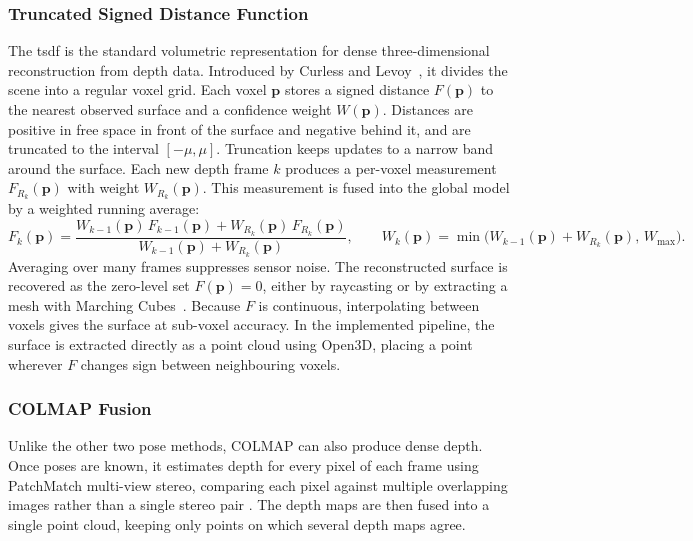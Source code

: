
%
\subsubsection{Truncated Signed Distance Function}
\label{subsec:ch5.tsdf}

The \gls{tsdf} is the standard volumetric
representation for dense three-dimensional reconstruction from depth data. Introduced by
Curless and Levoy~\cite{curlessVolumetricMethodBuilding1996}, it divides the scene
into a regular voxel grid. Each voxel $\mathbf{p}$ stores a signed distance
$F(\mathbf{p})$ to the nearest observed surface and a confidence weight
$W(\mathbf{p})$. Distances are positive in free space in front of the
surface and negative behind it, and are truncated to the interval
$[-\mu, \mu]$. Truncation keeps updates to a narrow band around the
surface. Each new depth frame $k$ produces a per-voxel
measurement $F_{R_k}(\mathbf{p})$ with weight $W_{R_k}(\mathbf{p})$. This
measurement is fused into the global model by a weighted running average:
\begin{equation}
  F_k(\mathbf{p}) =
  \frac{W_{k-1}(\mathbf{p})\,F_{k-1}(\mathbf{p}) + W_{R_k}(\mathbf{p})\,F_{R_k}(\mathbf{p})}
       {W_{k-1}(\mathbf{p}) + W_{R_k}(\mathbf{p})},
  \qquad
  W_k(\mathbf{p}) = \min\!\big(W_{k-1}(\mathbf{p}) + W_{R_k}(\mathbf{p}),\, W_{\max}\big).
  \label{eq:tsdf_fusion}
\end{equation}
Averaging over many frames suppresses sensor noise. The reconstructed
surface is recovered as the zero-level set $F(\mathbf{p}) = 0$, either by
raycasting or by extracting a mesh with Marching
Cubes~\cite{lorensen1987marching}. Because $F$ is continuous, interpolating
between voxels gives the surface at sub-voxel accuracy. 
In the implemented pipeline, the surface is extracted directly as a
point cloud using Open3D, placing a point wherever $F$ changes sign between neighbouring voxels.

\subsubsection{COLMAP Fusion}
\label{subsec:ch5.colmap_fusion}
Unlike the other two pose methods, COLMAP can also produce dense depth.
Once poses are known, it estimates depth for every pixel of each frame using PatchMatch multi-view stereo, 
comparing each pixel against multiple overlapping images rather than a single
stereo pair \cite{schonbergerPixelwiseViewSelection2016}. The depth maps are then fused into a single point cloud, 
keeping only points on which several depth maps agree.

